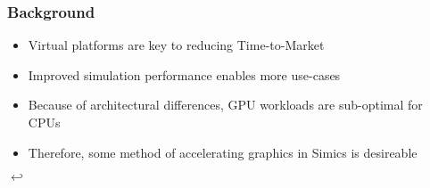 \begin{frame}
\frametitle{Background}

\begin{itemize}
\item Virtual platforms are key to reducing Time-to-Market
\item Improved simulation performance enables more use-cases
\item Because of architectural differences, GPU workloads are sub-optimal for CPUs
\item Therefore, some method of accelerating graphics in Simics is desireable
\end{itemize}

\begin{center}
{\Huge $\hookleftarrow$}
\end{center}

\end{frame}
